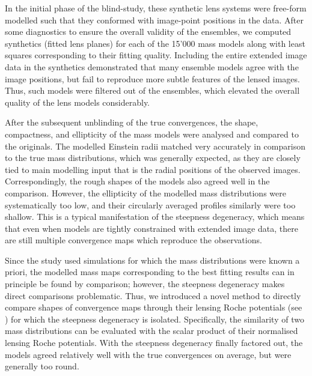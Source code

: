 In the initial phase of the blind-study, these synthetic lens systems were
free-form modelled such that they conformed with image-point positions in the
data.  After some diagnostics to ensure the overall validity of the ensembles,
we computed synthetics (fitted lens planes) for each of the 15'000 mass models
along with least squares corresponding to their fitting quality.  Including the
entire extended image data in the synthetics demonstrated that many ensemble
models agree with the image positions, but fail to reproduce more subtle
features of the lensed images.  Thus, such models were filtered out of the
ensembles, which elevated the overall quality of the lens models considerably.

After the subsequent unblinding of the true convergences, the shape,
compactness, and ellipticity of the mass models were analysed and compared to
the originals.  The modelled Einstein radii matched very accurately in comparison to the true mass distributions,
which was generally expected, as they are closely tied to main modelling input
that is the radial positions of the observed images. Correspondingly, the rough
shapes of the models also agreed well in the comparison.  However, the
ellipticity of the modelled mass distributions were systematically too low, and
their circularly averaged profiles similarly were too shallow.  This is a
typical manifestation of the steepness degeneracy, which means that even when
models are tightly constrained with extended image data, there are still
multiple convergence maps which reproduce the observations.

Since the study used simulations for which the mass distributions were known a
priori, the modelled mass maps corresponding to the best fitting results can in
principle be found by comparison; however, the steepness degeneracy makes direct
comparisons problematic.  Thus, we introduced a novel method to directly compare
shapes of convergence maps through their lensing Roche potentials (see
) for which the steepness degeneracy is isolated.
Specifically, the similarity of two mass distributions can be evaluated with the
scalar product of their normalised lensing Roche potentials.  With the steepness
degeneracy finally factored out, the models agreed relatively well with the true
convergences on average, but were generally too round.

